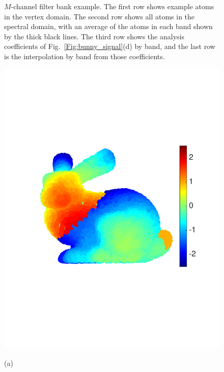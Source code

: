 \documentclass[journal, 10pt]{IEEEtran}
\begin{document}
\begin{figure}[bth]
\begin{minipage}[m]{0.16\linewidth}
\end{minipage}
\caption{$M$-channel filter bank example. The first row shows example atoms in the vertex domain. The second row shows all atoms in the spectral domain, with an average of the atoms in each band shown by the thick black lines. The third row shows the analysis coefficients of Fig.\ \ref{Fig:bunny_signal}(d) by band, and the last row is the interpolation by band from those coefficients.}\label{Fig:bunny_coef}
\end{figure}

\begin{figure}[tbh]
\begin{minipage}[m]{0.48\linewidth}
\centerline{\includegraphics[width=.8\linewidth]{fig_bunny_signal}}
\centerline{\small{(a)}}
\end{minipage}
\begin{minipage}[m]{0.48\linewidth}

\end{minipage}
\end{figure}
\end{document}
